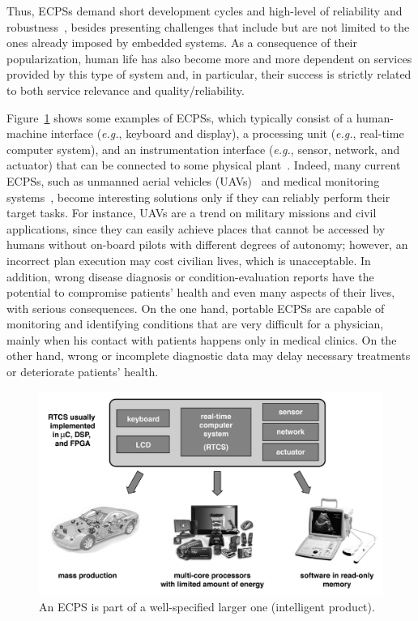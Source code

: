\documentclass{cta-author}
\begin{document}
Thus, ECPSs demand short development cycles and high-level of reliability and robustness~\cite{leeCPS,leeCPS2}, besides presenting challenges that include but are not limited to the ones already imposed by embedded systems. As a consequence of their popularization, human life has also become more and more dependent on services provided by this type of system and, in particular, their success is strictly related to both service relevance and quality/reliability. 

{\color{blue}
Figure~\ref{intelligent-product} shows some examples of ECPSs, which typically consist of a human-machine interface ({\it e.g.}, keyboard and display), a processing unit ({\it e.g.}, real-time computer system), and an instrumentation interface ({\it e.g.}, sensor, network, and actuator) that can be connected to some physical plant~\cite{Kopetz11}. Indeed, many current ECPSs, such as unmanned aerial vehicles (UAVs)~\cite{groza2015formal} and medical monitoring systems~\cite{Cordeiro09}, become interesting solutions only if they can reliably perform their target tasks. For instance, UAVs are a trend on military missions and civil applications, since they can easily achieve places that cannot be accessed by humans without on-board pilots with different degrees of autonomy; however, an incorrect plan execution may cost civilian lives, which is unacceptable. In addition, wrong disease diagnosis or condition-evaluation reports have the potential to compromise patients' health and even many aspects of their lives, with serious consequences. On the one hand, portable ECPSs are capable of monitoring and identifying conditions that are very difficult for a physician, mainly when his contact with patients happens only in medical clinics. On the other hand, wrong or incomplete diagnostic data may delay necessary treatments or deteriorate patients' health.
}
%
\begin{figure}[!t]
	\centering
	\includegraphics[width=\columnwidth]{figure1.jpg}
	\caption{An ECPS is part of a well-specified larger one (intelligent product).}
	\label{intelligent-product}
\end{figure}
\end{document}
